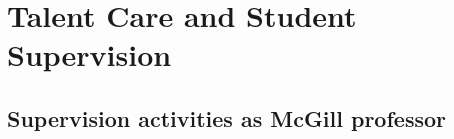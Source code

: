 


\section{Talent Care and Student Supervision}



\subsection{Supervision activities as McGill professor}

